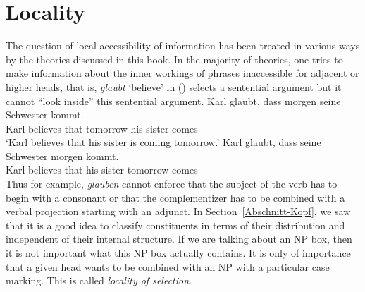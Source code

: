 
\section{Locality}
\label{Abschnitt-Diskussion-Lokalitaet}\label{sec-locality}

The question of local accessibility of information has been treated in various ways by the theories
discussed in this book. In the majority of theories, one tries to make information about the inner workings of phrases inaccessible
for adjacent or higher heads, that is, \emph{glaubt} `believe' in () selects a sentential argument but it cannot ``look
inside'' this sentential argument.
\eal
\ex 
\gll Karl glaubt, dass morgen seine Schwester kommt.\\
	 Karl believes that tomorrow his sister comes\\
\glt `Karl believes that his sister is coming tomorrow.'
\ex 
\gll Karl glaubt, dass seine Schwester morgen kommt.\\
	 Karl believes that his sister tomorrow comes\\
\zl
Thus for example, \emph{glauben} cannot enforce that the subject of the verb has to begin with a consonant or that the complementizer
has to be combined with a verbal projection starting with an adjunct.
In Section~\ref{Abschnitt-Kopf}, we saw that it is a good idea to classify constituents in terms of their distribution and
independent of their internal structure. If we are  talking about an NP box, then it is not important what this NP box actually
contains. It is only of importance that a given head wants to be combined with an NP with a
particular case marking. This is called \emph{locality of selection}.

